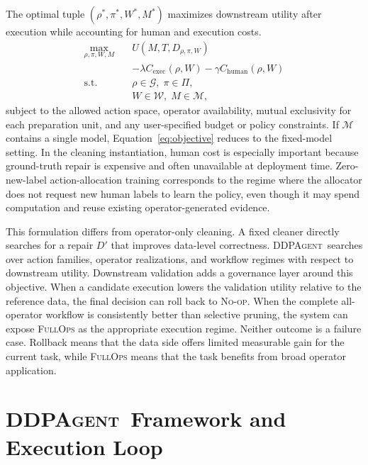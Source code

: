 \documentclass[sigconf, nonacm]{acmart}
\newcommand{\sys}{\textsc{DDPAgent}\xspace}
\newcommand{\noop}{\textsc{No-op}\xspace}
\newcommand{\fullops}{\textsc{FullOps}\xspace}
\begin{document}
The optimal tuple $(\rho^*,\pi^*,W^*,M^*)$ maximizes downstream utility after execution while accounting for human and execution costs.
\begin{equation}
  \begin{aligned}
  \max_{\rho,\pi,W,M}\quad
  &U(M,T,D_{\rho,\pi,W})\\
  &-\lambda C_{\mathrm{exec}}(\rho,W)-\gamma C_{\mathrm{human}}(\rho,W)\\
  \text{s.t.}\quad
  &\rho\in\mathcal{G},\;\pi\in\Pi,\\
  &W\in\mathcal{W},\;M\in\mathcal{M},
  \end{aligned}
  \label{eq:objective}
\end{equation}
subject to the allowed action space, operator availability, mutual exclusivity for each preparation unit, and any user-specified budget or policy constraints. If $\mathcal{M}$ contains a single model, Equation~\ref{eq:objective} reduces to the fixed-model setting. In the cleaning instantiation, human cost is especially important because ground-truth repair is expensive and often unavailable at deployment time. Zero-new-label action-allocation training corresponds to the regime where the allocator does not request new human labels to learn the policy, even though it may spend computation and reuse existing operator-generated evidence.

This formulation differs from operator-only cleaning. A fixed cleaner directly searches for a repair $D'$ that improves data-level correctness. \sys\ searches over action families, operator realizations, and workflow regimes with respect to downstream utility. Downstream validation adds a governance layer around this objective. When a candidate execution lowers the validation utility relative to the reference data, the final decision can roll back to \noop. When the complete all-operator workflow is consistently better than selective pruning, the system can expose \fullops as the appropriate execution regime. Neither outcome is a failure case. Rollback means that the data side offers limited measurable gain for the current task, while \fullops means that the task benefits from broad operator application.

\section{\sys\ Framework and Execution Loop}
\label{sec:execution}
\end{document}
